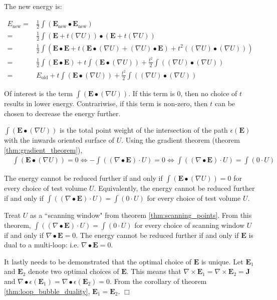 The new energy is: 

\begin{align*}
E_{\text{new}} = & \frac{1}{2}\int (\mathbf{E}_{\text{new}} \bullet \mathbf{E}_{\text{new}}) \\ 
= & \frac{1}{2}\int (\mathbf{E} + t (\nabla U)) \bullet (\mathbf{E} + t (\nabla U)) \\ 
= & \frac{1}{2}\int (\mathbf{E} \bullet \mathbf{E} + t(\mathbf{E} \bullet (\nabla U) + (\nabla U) \bullet \mathbf{E}) + t^2((\nabla U) \bullet (\nabla U))) \\
= & \frac{1}{2}\int (\mathbf{E} \bullet \mathbf{E}) + t\int (\mathbf{E} \bullet (\nabla U)) + \frac{t^2}{2}\int ((\nabla U) \bullet (\nabla U)) \\ 
= & E_{\text{old}} + t\int (\mathbf{E} \bullet (\nabla U)) + \frac{t^2}{2}\int ((\nabla U) \bullet (\nabla U))
\end{align*}

Of interest is the term \(\int (\mathbf{E} \bullet (\nabla U))\). If this term is \(0\), then no choice of \(t\) results in lower energy. Contrariwise, if this term is non-zero, then \(t\) can be chosen to decrease the energy further. 

\(\int (\mathbf{E} \bullet (\nabla U))\) is the total point weight of the intersection of the path \(\epsilon(\mathbf{E})\) with the inwards oriented surface of \(U\). Using the gradient theorem (theorem \ref{thm:gradient_theorem}), 
\begin{align*}
& \int (\mathbf{E} \bullet (\nabla U)) = 0
\iff -\int ((\nabla \bullet \mathbf{E}) \cdot U) = 0 
\iff \int ((\nabla \bullet \mathbf{E}) \cdot U) = \int (0 \cdot U) 
\end{align*}

The energy cannot be reduced further if and only if \(\int (\mathbf{E} \bullet (\nabla U)) = 0\) for every choice of test volume \(U\). Equivalently, the energy cannot be reduced further if and only if \(\int ((\nabla \bullet \mathbf{E}) \cdot U) = \int (0 \cdot U)\) for every choice of test volume \(U\).

Treat \(U\) as a ``scanning window" from theorem \ref{thm:scanning_points}. From this theorem, \(\int ((\nabla \bullet \mathbf{E}) \cdot U) = \int (0 \cdot U)\) for every choice of scanning window \(U\) if and only if \(\nabla \bullet \mathbf{E} = 0\). The energy cannot be reduced further if and only if \(\mathbf{E}\) is dual to a multi-loop: i.e. \(\nabla \bullet \mathbf{E} = 0\).

It lastly needs to be demonstrated that the optimal choice of \(\mathbf{E}\) is unique. Let \(\mathbf{E}_1\) and \(\mathbf{E}_2\) denote two optimal choices of \(\mathbf{E}\). This means that \(\nabla \times \mathbf{E}_1 = \nabla \times \mathbf{E}_2 = \mathbf{J}\) and \(\nabla \bullet \epsilon(\mathbf{E}_1) = \nabla \bullet \epsilon(\mathbf{E}_2) = 0\). From the corollary of theorem \ref{thm:loop_bubble_duality}, \(\mathbf{E}_1 = \mathbf{E}_2\). \(\Box\) 

